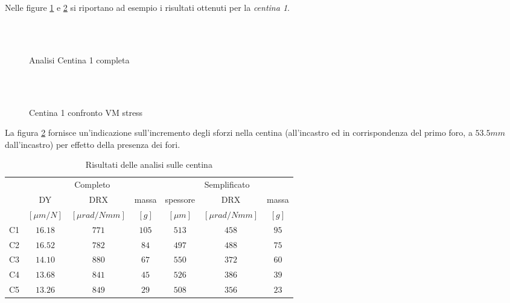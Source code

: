 \documentclass[
10pt, %
a4paper, %
oneside, %
headinclude,footinclude, %
BCOR5mm, %
]{scrartcl}
\begin{document}
Nelle figure \ref{fig:C1_comp} e \ref{fig:C1plot}  si riportano ad esempio i risultati ottenuti per la \emph{centina 1}.

\begin{figure}[htb]
	\centering
	 \\
	 \\
	\caption[Centina 1 completa]{Analisi Centina 1 completa} %
	\label{fig:C1_comp}
\end{figure}

\begin{figure}[htb]
	\centering
	 \\
	 \\
	\caption[Centina 1 confronto VM stress]{Centina 1 confronto VM stress} %
	\label{fig:C1plot}
\end{figure}

La figura \ref{fig:C1plot} fornisce un'indicazione sull'incremento degli sforzi nella centina (all'incastro ed in corrispondenza del primo foro, a $53.5mm$ dall'incastro) per effetto della presenza dei fori.


\begin{table}[hbt]
	\caption{Risultati delle analisi sulle centina}
	\centering
	\begin{tabular}{rcccccc}
		\toprule
		& \multicolumn{3}{c}{Completo} & \multicolumn{3}{c}{Semplificato}\\
		\cmidrule(r){2-4} \cmidrule(l){5-7} 
		& DY  & DRX & massa & spessore & DRX  & massa \\
		& $[\mu m/N]$ & $[\mu rad/Nmm]$ & $[g]$ & $[\mu m]$ & $[\mu rad/Nmm]$ & $[g]$ \\
		\midrule
		C1 & $16.18$ & $771$ & $105$ & $513$ & $458$ & $95$ \\
		C2 & $16.52$ & $782$ & $84$ & $497$ & $488$ & $75$ \\
		C3 & $14.10$ & $880$ & $67$ & $550$ & $372$ & $60$ \\
		C4 & $13.68$ & $841$ & $45$ & $526$ & $386$ & $39$ \\
		C5 & $13.26$ & $849$ & $29$ & $508$ & $356$ & $23$ \\
		\bottomrule
	\end{tabular}
	\label{tab:centine}
\end{table}
\end{document}
